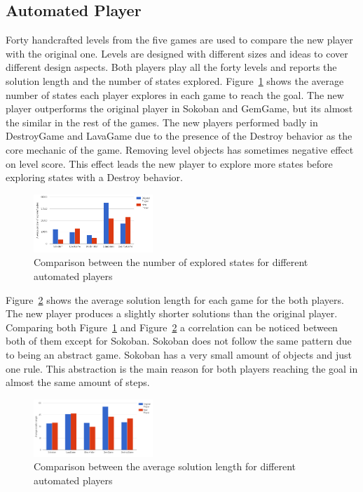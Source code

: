 \documentclass[letterpaper]{article}
\newcommand{\figref}[1]{Figure~\ref{Figure:#1}}
\begin{document}
\subsection{Automated Player}
Forty handcrafted levels from the five games are used to compare the new player with the original one. Levels are designed with different sizes and ideas to cover different design aspects. Both players play all the forty levels and reports the solution length and the number of states explored. \figref{automatedPlayerPerformance} shows the average number of states each player explores in each game to reach the goal. The new player outperforms the original player in Sokoban and GemGame, but its almost the similar in the rest of the games. The new players performed badly in DestroyGame and LavaGame due to the presence of the Destroy behavior as the core mechanic of the game. Removing level objects has sometimes negative effect on level score. This effect leads the new player to explore more states before exploring states with a Destroy behavior.\\\par

\begin{figure}[ht]
  	\centering
    \includegraphics[width=0.4\textwidth]{Images/automatedPlayerPerformance}
    \caption{Comparison between the number of explored states for different automated players}
    \label{Figure:automatedPlayerPerformance}
\end{figure}

\figref{automatedPlayerLength} shows the average solution length for each game for the both players. The new player produces  a slightly shorter solutions than the original player. Comparing both \figref{automatedPlayerPerformance} and \figref{automatedPlayerLength} a correlation can be noticed between both of them except for Sokoban. Sokoban does not follow the same pattern due to being an abstract game. Sokoban has a very small amount of objects and just one rule. This abstraction is the main reason for both players reaching the goal in almost the same amount of steps.

\begin{figure}[ht]
  	\centering
    \includegraphics[width=0.4\textwidth]{Images/automatedPlayerLength}
    \caption{Comparison between the average solution length for different automated players}
    \label{Figure:automatedPlayerLength}
\end{figure}
\end{document}
